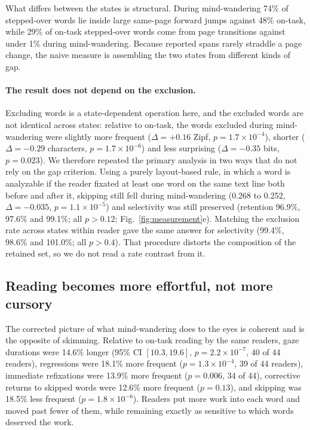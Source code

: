 \documentclass[11pt]{article}
\begin{document}
What differs between the states is structural. During mind-wandering 74\% of stepped-over words
lie inside large same-page forward jumps against 48\% on-task, while 29\% of on-task
stepped-over words come from page transitions against under 1\% during mind-wandering. Because
reported spans rarely straddle a page change, the naive measure is assembling the two states
from different kinds of gap.

\paragraph{The result does not depend on the exclusion.} Excluding words is a state-dependent
operation here, and the excluded words are not identical across states: relative to on-task, the
words excluded during mind-wandering were slightly more frequent ($\Delta=+0.16$ Zipf,
$p=1.7\times10^{-4}$), shorter ($\Delta=-0.29$ characters, $p=1.7\times10^{-6}$) and less
surprising ($\Delta=-0.35$ bits, $p=0.023$). We therefore repeated the primary analysis in two
ways that do not rely on the gap criterion. Using a purely layout-based rule, in which a word is
analyzable if the reader fixated at least one word on the same text line both before and after
it, skipping still fell during mind-wandering (0.268 to 0.252, $\Delta=-0.035$,
$p=1.1\times10^{-5}$) and selectivity was still preserved (retention 96.9\%, 97.6\% and 99.1\%;
all $p>0.12$; Fig.~\ref{fig:measurement}e). Matching the exclusion rate across states within reader gave the same answer for selectivity
(99.4\%, 98.6\% and 101.0\%; all $p>0.4$). That procedure distorts the composition of the retained
set, so we do not read a rate contrast from it.

\subsection{Reading becomes more effortful, not more cursory}

The corrected picture of what mind-wandering does to the eyes is coherent and is the opposite
of skimming. Relative to on-task reading by the same readers, gaze durations were 14.6\%
longer (95\% CI $[10.3, 19.6]$, $p=2.2\times10^{-7}$, 40 of 44 readers), regressions were 18.1\%
more frequent
($p=1.3\times10^{-4}$, 39 of 44 readers), immediate refixations were 13.9\% more frequent
($p=0.006$, 34 of 44), corrective returns to skipped words were 12.6\% more frequent
($p=0.13$), and skipping was 18.5\% less frequent ($p=1.8\times10^{-6}$). Readers put more
work into each word and moved past fewer of them, while remaining exactly as sensitive to
which words deserved the work.
\end{document}

